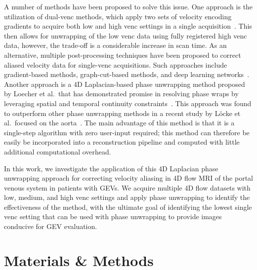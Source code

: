 A number of methods have been proposed to solve this issue. One approach is the utilization of dual-venc methods, which apply two sets of velocity encoding gradients to acquire both low and high venc settings in a single acquisition~\cite{nettFourdimensionalPhaseContrast2012, schnellAcceleratedDualvenc4D2017}. This then allows for unwrapping of the low venc data using fully registered high venc data, however, the trade-off is a considerable increase in scan time. As an alternative, multiple post-processing techniques have been proposed to correct aliased velocity data for single-venc acquisitions. Such approaches include gradient-based methods, graph-cut-based methods, and deep learning networks~\cite{zhangDivergenceFreeConstrainedPhase2021,justicePhaseUnwrapping4Dflow2018,nettFourdimensionalPhaseContrast2012}. Another approach is a 4D Laplacian-based phase unwrapping method proposed by Loecher et al.\ that has demonstrated promise in resolving phase wraps by leveraging spatial and temporal continuity constraints~\cite{loecherPhaseUnwrapping4D2016}. This approach was found to outperform other phase unwrapping methods in a recent study by L\"{o}cke et al.\ focused on the aorta~\cite{lockeComparisonPhaseUnwrapping2023}. The main advantage of this method is that it is a single-step algorithm with zero user-input required; this method can therefore be easily be incorporated into a reconstruction pipeline and computed with little additional computational overhead.

In this work, we investigate the application of this 4D Laplacian phase unwrapping approach for correcting velocity aliasing in 4D flow MRI of the portal venous system in patients with GEVs. We acquire multiple 4D flow datasets with low, medium, and high venc settings and apply phase unwrapping to identify the effectiveness of the method, with the ultimate goal of identifying the lowest single venc setting that can be used with phase unwrapping to provide images conducive for GEV evaluation. 

\section{Materials \& Methods}\label{sec:gevenc_methods}
